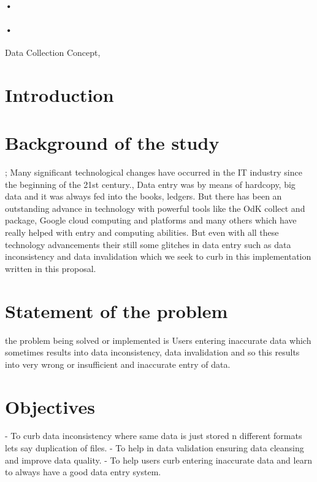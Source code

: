 \documentclass[12pt,]{article}
\begin{document}
\begin{titlepage}
\paragraph*{•}
\paragraph*{•}
  \begin{flushright}
  Data Collection Concept,\\
 
 \tableofcontents

  \end{flushright}
\date{\today}
\end{titlepage}

\newpage



\section{Introduction}
\section{Background of the study}
; Many significant technological changes have occurred in the IT industry since the beginning of the 21st century., Data entry was by means of hardcopy, big data and it was always fed into the books, ledgers. But there has been an outstanding advance in technology with powerful tools like the OdK collect and package, Google cloud computing and platforms and many others which have really helped with entry and computing abilities. But even with all these technology advancements their still some glitches in data entry such as data inconsistency and data invalidation which we seek to curb in this implementation written in this proposal.

\section{Statement of the problem}
the problem being solved or implemented is Users entering inaccurate data which sometimes results into data inconsistency, data invalidation and so this results into very wrong or insufficient and inaccurate entry of data.

\section{Objectives}
-	To curb data inconsistency where same data is just stored n different formats lets say duplication of files.
-	To help in data validation ensuring data cleansing and improve data quality.
-	To help users curb entering inaccurate data and learn to always have a good data entry system.
\end{document}
